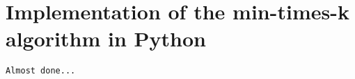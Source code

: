 \documentclass[a4paper]{article}
\begin{document}
\begin{comment}
\section{Example with $n=7, k=4$}

The initial state of $O$, $P$ and $R$ is shown in tables~\ref{tab:O-ex00} through~\ref
We begin the 

\begin{table}
\centering
\begin{tabular} {| l ||c |c |c |c |c |c |c |}  
\multicolumn{ 8 }{c}{$O_0$ } \\  
\multicolumn{1}{l}{index} & \multicolumn{1}{c}{0} & \multicolumn{1}{c}{1} & \multicolumn{1}{c}{2} & \multicolumn{1}{c}{3} & \multicolumn{1}{c}{4} & \multicolumn{1}{c}{5} & \multicolumn{1}{c}{6} \\ \hline 
occurr & 0 & 0 & 0 & 0 & 0 & 0 & 0 \\ \hline 
occurrInPairs & 0 & 0 & 0 & 0 & 0 & 0 & 0 \\ \hline 
\end{tabular}  

\begin{tabular} {| l ||c |c |c |c |c |c |c |c |c |c |c |c |c |c |c |c |c |c |c |c |c |c |c |c |}  
\multicolumn{ 25 }{c}{ $P_0$ } \\ \hline 
pair & 0,1 & 0,2 & 0,3 & 0,4 & 0,5 & 0,6 & 1,2 & 1,3 & 1,4 & 1,5 & 1,6 & 2,3 & 2,4 & 2,5 & 2,6 & 3,4 & 3,5 & 3,6 & 4,5 & 4,6 & 5,6 & 7,8 & 7,9 & 8,9 \\ \hline 
occurr & 0 & 0 & 0 & 0 & 0 & 0 & 0 & 0 & 0 & 0 & 0 & 0 & 0 & 0 & 0 & 0 & 0 & 0 & 0 & 0 & 0 & 0 & 0 & 0 \\ \hline 
\end{tabular} 

\caption{
Initial state of $O$, $P$ and $R$ for $n=7, k=4$
}
\label{tab:O-ex00}
\end{table}

\end{comment}
 
\section{Implementation of the min-times-k algorithm in Python}

\verb!Almost done...!
\end{document}

